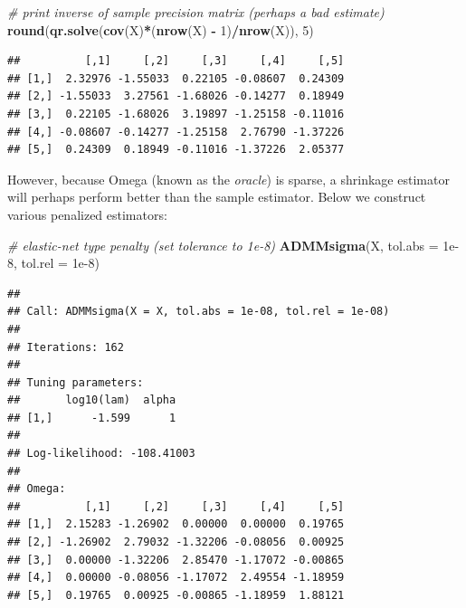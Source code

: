 \documentclass[12pt,]{book}
\newenvironment{Shaded}{\begin{snugshade}}{\end{snugshade}}
\newcommand{\CommentTok}[1]{\textcolor[rgb]{0.56,0.35,0.01}{\textit{#1}}}
\newcommand{\DataTypeTok}[1]{\textcolor[rgb]{0.13,0.29,0.53}{#1}}
\newcommand{\DecValTok}[1]{\textcolor[rgb]{0.00,0.00,0.81}{#1}}
\newcommand{\FloatTok}[1]{\textcolor[rgb]{0.00,0.00,0.81}{#1}}
\newcommand{\KeywordTok}[1]{\textcolor[rgb]{0.13,0.29,0.53}{\textbf{#1}}}
\newcommand{\NormalTok}[1]{#1}
\newcommand{\OperatorTok}[1]{\textcolor[rgb]{0.81,0.36,0.00}{\textbf{#1}}}
\newcommand{\StringTok}[1]{\textcolor[rgb]{0.31,0.60,0.02}{#1}}
\theoremstyle{definition}
\theoremstyle{definition}
\theoremstyle{definition}
\theoremstyle{remark}
\begin{document}
\vspace{0.5cm}

\begin{Shaded}
\begin{Highlighting}[]
\CommentTok{# print inverse of sample precision matrix (perhaps a bad estimate)}
\KeywordTok{round}\NormalTok{(}\KeywordTok{qr.solve}\NormalTok{(}\KeywordTok{cov}\NormalTok{(X)}\OperatorTok{*}\NormalTok{(}\KeywordTok{nrow}\NormalTok{(X) }\OperatorTok{-}\StringTok{ }\DecValTok{1}\NormalTok{)}\OperatorTok{/}\KeywordTok{nrow}\NormalTok{(X)), }\DecValTok{5}\NormalTok{)}
\end{Highlighting}
\end{Shaded}

\begin{verbatim}
##          [,1]     [,2]     [,3]     [,4]     [,5]
## [1,]  2.32976 -1.55033  0.22105 -0.08607  0.24309
## [2,] -1.55033  3.27561 -1.68026 -0.14277  0.18949
## [3,]  0.22105 -1.68026  3.19897 -1.25158 -0.11016
## [4,] -0.08607 -0.14277 -1.25158  2.76790 -1.37226
## [5,]  0.24309  0.18949 -0.11016 -1.37226  2.05377
\end{verbatim}

\vspace{0.5cm}

However, because Omega (known as the \emph{oracle}) is sparse, a
shrinkage estimator will perhaps perform better than the sample
estimator. Below we construct various penalized estimators:

\vspace{0.5cm}

\begin{Shaded}
\begin{Highlighting}[]
\CommentTok{# elastic-net type penalty (set tolerance to 1e-8)}
\KeywordTok{ADMMsigma}\NormalTok{(X, }\DataTypeTok{tol.abs =} \FloatTok{1e-8}\NormalTok{, }\DataTypeTok{tol.rel =} \FloatTok{1e-8}\NormalTok{)}
\end{Highlighting}
\end{Shaded}

\begin{verbatim}
## 
## Call: ADMMsigma(X = X, tol.abs = 1e-08, tol.rel = 1e-08)
## 
## Iterations: 162
## 
## Tuning parameters:
##       log10(lam)  alpha
## [1,]      -1.599      1
## 
## Log-likelihood: -108.41003
## 
## Omega:
##          [,1]     [,2]     [,3]     [,4]     [,5]
## [1,]  2.15283 -1.26902  0.00000  0.00000  0.19765
## [2,] -1.26902  2.79032 -1.32206 -0.08056  0.00925
## [3,]  0.00000 -1.32206  2.85470 -1.17072 -0.00865
## [4,]  0.00000 -0.08056 -1.17072  2.49554 -1.18959
## [5,]  0.19765  0.00925 -0.00865 -1.18959  1.88121
\end{verbatim}
\end{document}
